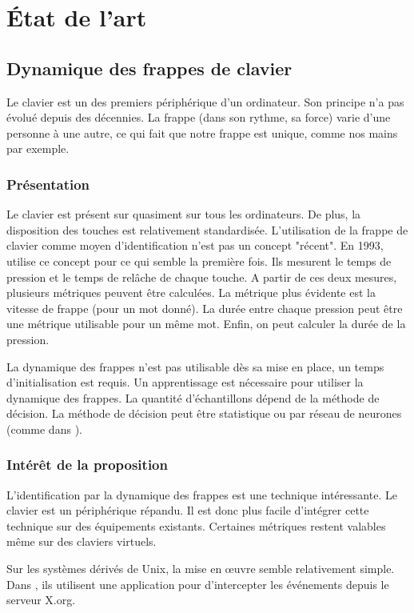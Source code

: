 \documentclass[conference,compsoc]{IEEEtran}
\begin{document}
\section{État de l'art}

\subsection{Dynamique des frappes de clavier}

Le clavier est un des premiers périphérique d'un ordinateur. Son principe n'a pas évolué depuis des décennies. La frappe (dans son rythme, sa force) varie d'une personne à une autre, ce qui fait que notre frappe est unique, comme nos mains par exemple.

\subsubsection{Présentation}

Le clavier est présent sur quasiment sur tous les ordinateurs. De plus, la disposition des touches est relativement standardisée.
L'utilisation de la frappe de clavier comme moyen d'identification n'est pas un concept "récent". En 1993, \cite{brown1993user} utilise ce concept pour ce qui semble la première fois. Ils mesurent le temps de pression et le temps de relâche de chaque touche. A partir de ces deux mesures, plusieurs métriques peuvent être calculées. La métrique plus évidente est la vitesse de frappe (pour un mot donné). La durée entre chaque pression peut être une métrique utilisable pour un même mot. Enfin, on peut calculer la durée de la pression.

La dynamique des frappes n'est pas utilisable dès sa mise en place, un temps d'initialisation est requis. Un apprentissage est nécessaire pour utiliser la dynamique des frappes. La quantité d'échantillons dépend de la méthode de décision. La méthode de décision peut être statistique ou par réseau de neurones (comme dans \cite{7435705}).

\subsubsection{Intérêt de la proposition}
L'identification par la dynamique des frappes est une technique intéressante. Le clavier est un périphérique répandu. Il est donc plus facile d'intégrer cette technique sur des équipements existants. Certaines métriques restent valables même sur des claviers virtuels.

Sur les systèmes dérivés de Unix, la mise en \oe{}uvre semble relativement simple. Dans \cite{brown1993user}, ils utilisent une application pour d'intercepter les événements depuis le serveur X.org.
\end{document}
